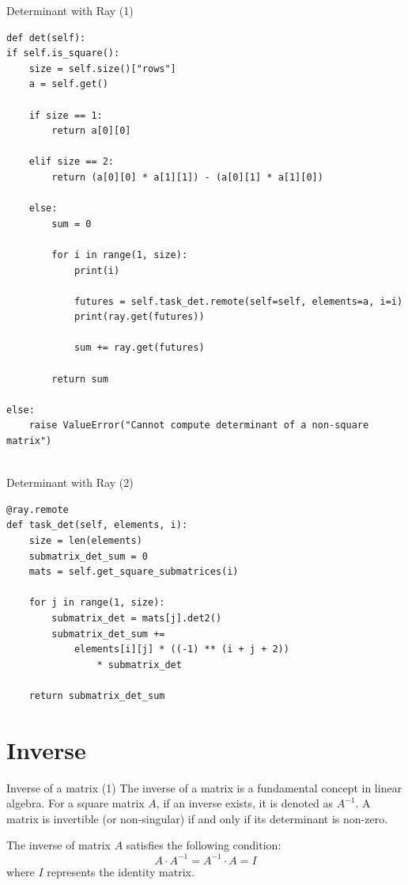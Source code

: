 \documentclass{beamer}
\begin{document}
\begin{frame}[fragile]{Determinant with Ray (1)}
    \begin{tiny}
        \begin{verbatim}
def det(self):
if self.is_square():
    size = self.size()["rows"]
    a = self.get()

    if size == 1:
        return a[0][0]

    elif size == 2:
        return (a[0][0] * a[1][1]) - (a[0][1] * a[1][0])

    else:
        sum = 0

        for i in range(1, size):
            print(i)

            futures = self.task_det.remote(self=self, elements=a, i=i)
            print(ray.get(futures))

            sum += ray.get(futures)

        return sum

else:
    raise ValueError("Cannot compute determinant of a non-square matrix")
        
            \end{verbatim}
    \end{tiny}
\end{frame}

\begin{frame}[fragile]{Determinant with Ray (2)}

    \begin{small}
        \begin{verbatim}
@ray.remote
def task_det(self, elements, i):
    size = len(elements)
    submatrix_det_sum = 0
    mats = self.get_square_submatrices(i)

    for j in range(1, size):
        submatrix_det = mats[j].det2()
        submatrix_det_sum += 
            elements[i][j] * ((-1) ** (i + j + 2)) 
                * submatrix_det

    return submatrix_det_sum
    \end{verbatim}
    \end{small}

\end{frame}

\section{Inverse}
\begin{frame}{Inverse of a matrix (1)}
    The \alert{inverse of a matrix} is a fundamental concept in linear algebra. For a square matrix $A$, if an inverse exists, it is denoted as $A^{-1}$. A matrix is invertible (or non-singular) if and only if its determinant is non-zero.

    The inverse of matrix $A$ satisfies the following condition:
    $$
        A \cdot A^{-1} = A^{-1} \cdot A = I
    $$
    where $I$ represents the identity matrix.

\end{frame}
\end{document}
